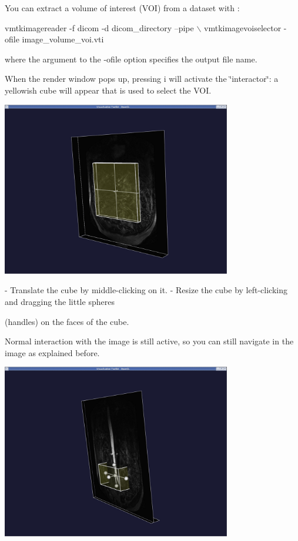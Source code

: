 You can extract a volume of interest (V\+OI) from a dataset with \+:


\begin{DoxyCode}
 vmtkimagereader -f dicom -d dicom\_directory --pipe \(\backslash\)
vmtkimagevoiselector -ofile image\_volume\_voi.vti
\end{DoxyCode}


where the argument to the {\ttfamily -\/ofile} option specifies the output file name.

When the render window pops up, pressing {\ttfamily i} will activate the \char`\"{}interactor\char`\"{}\+: a yellowish cube will appear that is used to select the V\+OI.

 
\begin{DoxyImageNoCaption}
  \mbox{\includegraphics[width=0.75\textwidth]{voi_cube}}
\end{DoxyImageNoCaption}
 \begin{DoxyVerb}- Translate the cube by middle-clicking on it.
- Resize the cube by left-clicking and dragging the little spheres 
\end{DoxyVerb}
 (handles) on the faces of the cube.
\begin{DoxyItemize}
\item Normal interaction with the image is still active, so you can still navigate in the image as explained before.
\end{DoxyItemize}

 
\begin{DoxyImageNoCaption}
  \mbox{\includegraphics[width=0.75\textwidth]{voi_cube2}}
\end{DoxyImageNoCaption}


